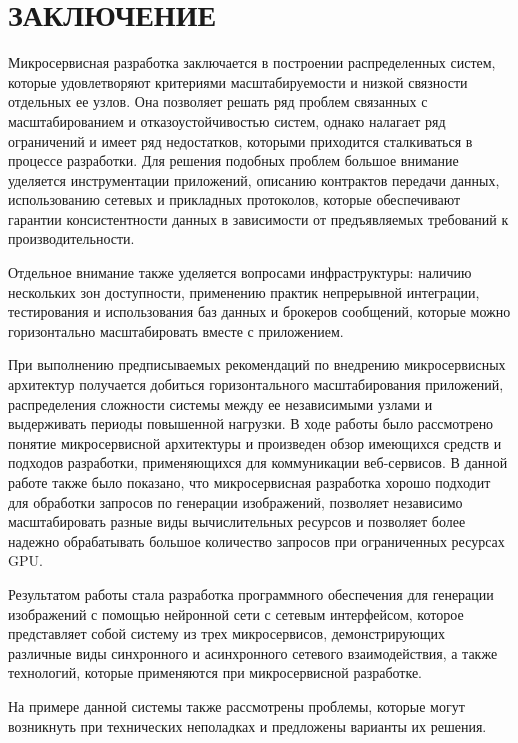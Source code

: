 \chapter*{ \large ЗАКЛЮЧЕНИЕ}

Микросервисная разработка заключается в построении распределенных систем, которые удовлетворяют
критериями масштабируемости и низкой связности отдельных ее узлов.
Она позволяет решать ряд проблем связанных с масштабированием и отказоустойчивостью систем, 
однако налагает ряд ограничений и имеет ряд недостатков, 
которыми приходится сталкиваться в процессе разработки.
Для решения подобных проблем большое внимание уделяется инструментации приложений, описанию контрактов
передачи данных, использованию сетевых и прикладных протоколов, которые обеспечивают гарантии
консистентности данных в зависимости от предъявляемых требований к производительности.

Отдельное внимание также уделяется вопросами инфраструктуры: наличию нескольких зон доступности, 
применению практик непрерывной интеграции, тестирования и использования баз данных и брокеров сообщений,
которые можно горизонтально масштабировать вместе с приложением.

При выполнению предписываемых рекомендаций по внедрению микросервисных архитектур получается
добиться горизонтального масштабирования приложений, распределения сложности системы 
между ее независимыми узлами и выдерживать периоды повышенной нагрузки.
В ходе работы было рассмотрено понятие микросервисной архитектуры и произведен обзор имеющихся средств и подходов разработки,
применяющихся для коммуникации веб-сервисов.
В данной работе также было показано, что микросервисная разработка хорошо подходит для обработки запросов
по генерации изображений, позволяет независимо масштабировать разные виды вычислительных ресурсов и 
позволяет более надежно обрабатывать большое количество запросов при ограниченных ресурсах GPU.

Результатом работы стала разработка программного обеспечения для генерации изображений
с помощью нейронной сети с сетевым интерфейсом, которое представляет собой систему из трех микросервисов,
демонстрирующих различные виды синхронного и асинхронного сетевого взаимодействия, а также технологий,
которые применяются при микросервисной разработке. 

На примере данной системы также рассмотрены проблемы, которые могут возникнуть при технических неполадках
и предложены варианты их решения.

